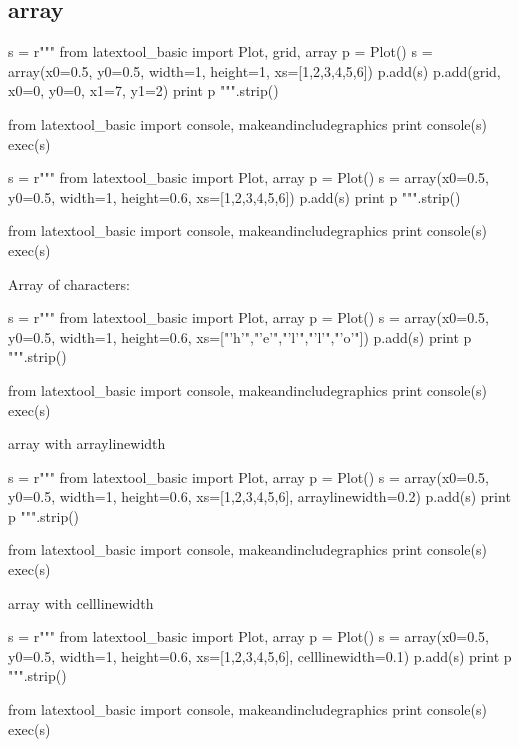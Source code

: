 \subsection{array}

\begin{python}
s = r"""
from latextool_basic import Plot, grid, array
p = Plot()
s = array(x0=0.5, y0=0.5, width=1, height=1, xs=[1,2,3,4,5,6])
p.add(s)
p.add(grid, x0=0, y0=0, x1=7, y1=2)
print p
""".strip()

from latextool_basic import console, makeandincludegraphics
print console(s)
exec(s)
\end{python}



\newpage
\begin{python}
s = r"""
from latextool_basic import Plot, array
p = Plot()
s = array(x0=0.5, y0=0.5, width=1, height=0.6, xs=[1,2,3,4,5,6])
p.add(s)
print p
""".strip()

from latextool_basic import console, makeandincludegraphics
print console(s)
exec(s)
\end{python}



\newpage
Array of characters:
\begin{python}
s = r"""
from latextool_basic import Plot, array
p = Plot()
s = array(x0=0.5, y0=0.5, width=1, height=0.6, 
          xs=["'h'","'e'","'l'","'l'","'o'"])
p.add(s)
print p
""".strip()

from latextool_basic import console, makeandincludegraphics
print console(s)
exec(s)
\end{python}



\newpage
array with arraylinewidth
\begin{python}
s = r"""
from latextool_basic import Plot, array
p = Plot()
s = array(x0=0.5, y0=0.5, width=1, height=0.6, 
          xs=[1,2,3,4,5,6],
          arraylinewidth=0.2)
p.add(s)
print p
""".strip()

from latextool_basic import console, makeandincludegraphics
print console(s)
exec(s)
\end{python}




\newpage
array with celllinewidth
\begin{python}
s = r"""
from latextool_basic import Plot, array
p = Plot()
s = array(x0=0.5, y0=0.5, width=1, height=0.6, 
          xs=[1,2,3,4,5,6],
          celllinewidth=0.1)
p.add(s)
print p
""".strip()

from latextool_basic import console, makeandincludegraphics
print console(s)
exec(s)
\end{python}




